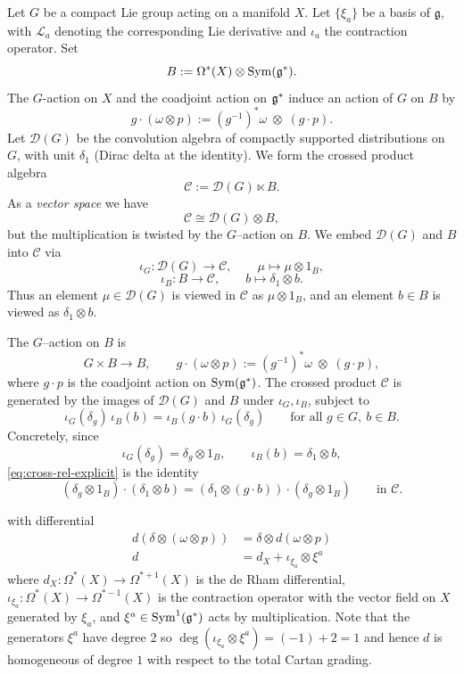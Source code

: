 \documentclass[12pt]{article}
\begin{document}
\begin{definition}
Let $G$ be a compact Lie group acting on a manifold $X$.
Let $\{ \xi_a \}$ be a basis of $\mathfrak g$, with
$\mathcal{L}_a$ denoting the corresponding Lie derivative
and $\iota_a$ the contraction operator. Set
\[
B := \Omega^*(X)\otimes \operatorname{Sym}(\frak g^*).
\]
The $G$-action on $X$ and the coadjoint action on $\frak g^*$ induce an
action of $G$ on $B$ by
\[
g\cdot(\omega\otimes p)
:= (g^{-1})^*\omega\;\otimes\;(g\cdot p).
\]
Let $\mathcal D(G)$ be the convolution algebra of compactly supported distributions on $G$, with unit $\delta_1$ (Dirac delta at the identity). We form the crossed product algebra
\[
\mathcal C := \mathcal D(G)\ltimes B.
\]
As a \emph{vector space} we have
\[
\mathcal C \cong \mathcal D(G)\otimes B,
\]
but the multiplication is twisted by the $G$--action on $B$. We embed $\mathcal D(G)$ and $B$ into $\mathcal C$ via
\[
\iota_G : \mathcal D(G)\longrightarrow \mathcal C,
\qquad
\mu \longmapsto \mu\otimes 1_B,
\]
\[
\iota_B : B\longrightarrow \mathcal C,
\qquad
b \longmapsto \delta_1\otimes b.
\]
Thus an element $\mu\in\mathcal D(G)$ is viewed in $\mathcal C$ as
$\mu\otimes 1_B$, and an element $b\in B$ is viewed as $\delta_1\otimes b$.

The $G$--action on $B$ is
\[
G\times B\to B,\qquad
g\cdot(\omega\otimes p)
:= (g^{-1})^*\omega\;\otimes\;(g\cdot p),
\]
where $g\cdot p$ is the coadjoint action on $\operatorname{Sym}(\mathfrak g^*)$. The crossed product $\mathcal C$ is generated by the images of
$\mathcal D(G)$ and $B$ under $\iota_G,\iota_B$, subject to
\begin{equation}\label{eq:cross-rel-explicit}
\iota_G(\delta_g)\,\iota_B(b)
=
\iota_B(g\cdot b)\,\iota_G(\delta_g)
\qquad
\text{for all } g\in G,\ b\in B.
\end{equation}
Concretely, since
\[
\iota_G(\delta_g) = \delta_g\otimes 1_B,
\qquad
\iota_B(b) = \delta_1\otimes b,
\]
\eqref{eq:cross-rel-explicit} is the identity
\[
(\delta_g\otimes 1_B)\cdot(\delta_1\otimes b)
=
(\delta_1\otimes (g\cdot b))\cdot(\delta_g\otimes 1_B)
\qquad\text{in }\mathcal C.
\]

with differential
\begin{align*}
    d(\delta \otimes (\omega \otimes p)) &= \delta \otimes d(\omega \otimes p) \\
    d &= d_X + \iota_{\xi_a} \otimes \xi^a
\end{align*}
where $d_X:\Omega^*(X) \to \Omega^{*+1}(X)$ is the de Rham differential, $\iota_{\xi_a}:\Omega^*(X) \to \Omega^{*-1}(X)$ is the contraction operator with the vector field on $X$ generated by $\xi_a$, and $\xi^a \in \operatorname{Sym}^1(\mathfrak g^*)$ acts by multiplication. Note that 
the generators $\xi^a$ have degree 2 so $\deg(\iota_{\xi_a}\otimes \xi^a) = (-1) + 2 = 1$
and hence $d$ is homogeneous of degree $1$ with respect to the total Cartan grading.
\end{definition}
\end{document}
